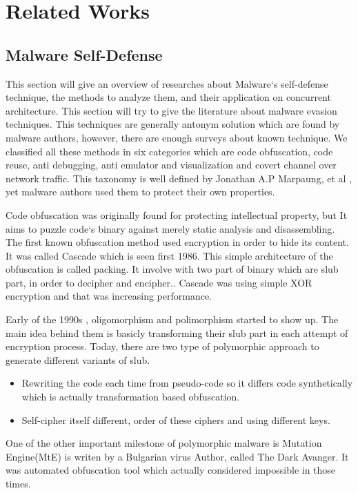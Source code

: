 
\chapter{Related Works}
\section{Malware Self-Defense}
This section will give an overview of researches about Malware`s self-defense technique, the methods to analyze them, and their application on concurrent architecture. 
This section will try to give the literature about malware evasion techniques. This techniques are generally antonym solution which are found by malware authors, however, there are enough surveys about known technique. We classified all these methods in six categories which are code obfuscation, code reuse, anti debugging, anti emulator and visualization and covert channel over network traffic. This taxonomy is well defined by Jonathan A.P Marpaung, et al \cite{marpaung2012survey}, yet malware authors used them to protect their own properties. 


Code obfuscation was originally  found for protecting intellectual property\cite{balakrishnan2005code}, but It aims to puzzle code`s binary against merely static analysis and disassembling\cite{nachenberg1996understanding}. The first known obfuscation method used encryption in order to hide its content. It was called Cascade which is seen first 1986\cite{you2010malware}. This simple architecture of the obfuscation is called packing\cite{internotsecurityteam}. It involve with two part of binary which are slub part, in order to decipher and encipher.\cite{marpaung2012survey}. Cascade was using simple XOR encryption and that was increasing performance.

Early of the 1990s , oligomorphism and polimorphism started to show up\cite{you2010malware}. The main idea behind them is basicly transforming their slub part in each attempt of encryption process\cite{nachenberg1996understanding}. Today, there are two type of  polymorphic approach to generate different variants of slub.\cite{li2011mechanisms}
\begin{itemize}
  \item Rewriting the code each time from pseudo-code so it differs code synthetically which is actually transformation based obfuscation.
  \item Self-cipher itself different, order of these ciphers and using different keys.
\end{itemize}
One of the other important milestone of polymorphic malware is Mutation Engine(MtE) is writen by a Bulgarian virus Author, called The Dark Avanger. It was automated obfuscation tool which actually considered impossible in those times.\cite{anonymous1}

